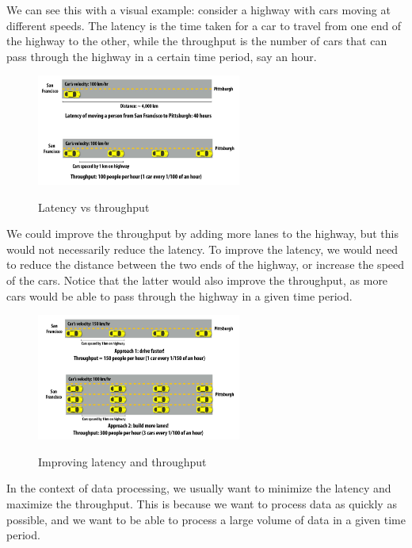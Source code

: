 We can see this with a visual example: consider a highway with cars moving at different speeds.
The latency is the time taken for a car to travel from one end of the highway to the other, while
the throughput is the number of cars that can pass through the highway in a certain time period,
say an hour.

\begin{figure}[H]
    \centering
    \includegraphics[width=0.6\textwidth]{figures/lat_vs_throu.png}
    \label{fig:latency_throughput}
    \caption{Latency vs throughput}
\end{figure}

We could improve the throughput by adding more lanes to the highway, but this would not necessarily
reduce the latency. To improve the latency, we would need to reduce the distance between the two ends
of the highway, or increase the speed of the cars. Notice that the latter would also improve the throughput,
as more cars would be able to pass through the highway in a given time period.

\begin{figure}[H]
    \centering
    \includegraphics[width=0.6\textwidth]{figures/lat_vs_throu2.png}
    \label{fig:latency_throughput2}
    \caption{Improving latency and throughput}
\end{figure}

In the context of data processing, we usually want to minimize the latency and maximize the throughput.
This is because we want to process data as quickly as possible, and we want to be able to process a large
volume of data in a given time period.

